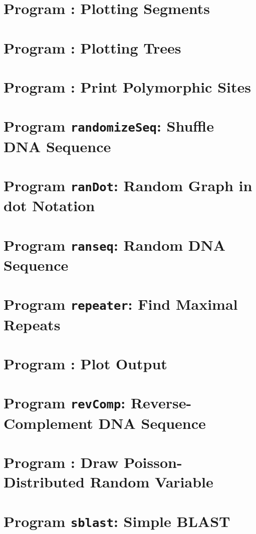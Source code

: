 \documentclass[a4paper]{report}
\begin{document}
\chapter{Program : Plotting Segments}\label{ch:ps}

\chapter{Program : Plotting Trees}\label{ch:pt}

\chapter{Program : Print Polymorphic Sites}\label{ch:pp}

\chapter{Program \texttt{randomizeSeq}: Shuffle DNA
  Sequence}\label{ch:rs}

\chapter{Program \texttt{ranDot}: Random Graph in dot Notation}\label{ch:rd}

\chapter{Program \texttt{ranseq}: Random DNA Sequence}\label{ch:ran}

\chapter{Program \texttt{repeater}: Find Maximal
  Repeats}\label{ch:rep}

\chapter{Program : Plot 
  Output}\label{ch:r2p}

\chapter{Program \texttt{revComp}: Reverse-Complement DNA
  Sequence}\label{ch:rev}

\chapter{Program : Draw Poisson-Distributed Random
  Variable}\label{ch:rpo}

\chapter{Program \texttt{sblast}: Simple BLAST}\label{ch:sb}

\end{document}
